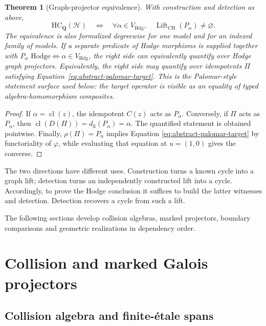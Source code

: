 \documentclass[11pt]{article}
\newtheorem{theorem}{Theorem}[section]
\theoremstyle{definition}
\theoremstyle{remark}
\DeclareMathOperator{\Lift}{Lift}
\newcommand{\Q}{\mathbf Q}
\begin{document}
\begin{theorem}[Graph-projector equivalence]
\label{thm:hodge-graph-equivalence}
With construction and detection as above,
\[
  \mathrm{HC}_{\Q}(\mathscr H)
  \quad\Longleftrightarrow\quad
  \forall\alpha\in V_{\mathrm{Hdg}},\quad
    \Lift_{\mathrm{CH}}(P_\alpha)\neq\varnothing.
\]
The equivalence is also formalized degreewise for one model and for an
indexed family of models.  If a separate predicate of Hodge morphisms is
supplied together with
\(P_\alpha\text{ Hodge}\Longleftrightarrow
\alpha\in V_{\mathrm{Hdg}}\), the right side can equivalently quantify over
Hodge graph projectors.
Equivalently, the right side may quantify over idempotents \(\Pi\) satisfying
Equation~\eqref{eq:abstract-palomar-target}.  This is the Palomar-style
statement surface used below: the target operator is visible as an equality
of typed algebra-homomorphism composites.
\end{theorem}

\begin{proof}
If \(\alpha=\operatorname{cl}(z)\), the idempotent \(C(z)\) acts as
\(P_\alpha\).  Conversely, if \(\Pi\) acts as \(P_\alpha\), then
\(\operatorname{cl}(D(\Pi))=d_{\mathrm{ll}}(P_\alpha)=\alpha\).
The quantified statement is obtained pointwise.  Finally,
\(\rho(\Pi)=P_\alpha\) implies Equation
\eqref{eq:abstract-palomar-target} by functoriality of \(\varphi\), while
evaluating that equation at \(u=(1,0)\) gives the converse.
\end{proof}

The two directions have different uses.  Construction turns a known cycle
into a graph lift; detection turns an independently constructed lift into
a cycle.  Accordingly, to prove the Hodge conclusion it suffices to build
the latter witnesses and detection. Detection recovers a cycle from such a lift.

The following sections develop collision algebras, marked projectors,
boundary comparisons and geometric realizations in dependency order.

\section{Collision and marked Galois projectors}
\label{sec:projectors}

\subsection{Collision algebra and finite-\'etale spans}
\label{sec:collision}
\end{document}
